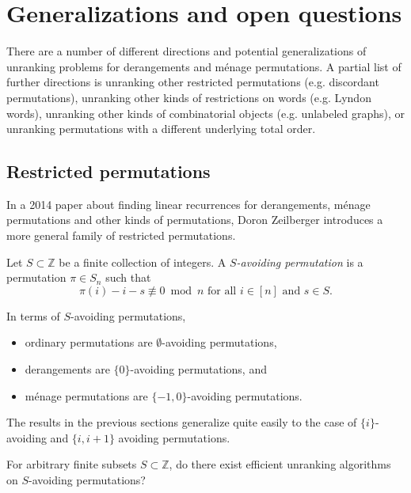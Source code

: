 

\section{Generalizations and open questions}

There are a number of different directions and potential generalizations of
unranking problems for derangements and m\'enage permutations.
A partial list of further directions is
unranking other restricted permutations
(e.g. discordant permutations),
unranking other kinds of restrictions on words
(e.g. Lyndon words),
unranking other kinds of combinatorial objects
(e.g. unlabeled graphs), or
unranking permutations with a different underlying total order.
%
\subsection{Restricted permutations}
In a 2014 paper about finding linear recurrences for derangements, m\'enage
permutations and other kinds of permutations, Doron Zeilberger
introduces a more general family of restricted permutations.
\begin{definition}
  Let $S \subset \mathbb Z$ be a finite collection of integers.
  A \textit{$S$-avoiding permutation} is a permutation $\pi \in S_n$ such that
  \[
    \pi(i) - i - s \not\equiv 0 \bmod n \text{ for all } i \in [n] \text{ and } s \in S.
  \]
\end{definition}

\begin{example}
  In terms of $S$-avoiding permutations, \begin{itemize}
    \item ordinary permutations are $\emptyset$-avoiding permutations,
    \item derangements are $\{0\}$-avoiding permutations, and
    \item m\'enage permutations are $\{-1,0\}$-avoiding permutations.
  \end{itemize}
\end{example}

The results in the previous sections generalize quite easily to the case of
$\{i\}$-avoiding and $\{i, i+1\}$ avoiding permutations.

\begin{openquestion}
  For arbitrary finite subsets $S \subset \mathbb Z$,
  do there exist efficient unranking algorithms on $S$-avoiding permutations?
\end{openquestion}

